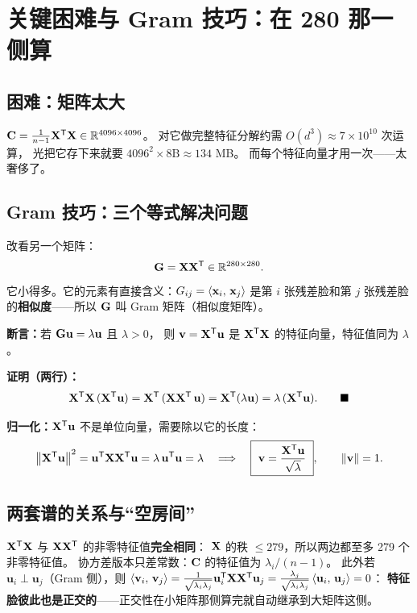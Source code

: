 \section{关键困难与 Gram 技巧：在 280 那一侧算}

\subsection{困难：矩阵太大}

$\mathbf{C}=\frac{1}{n-1}\mathbf{X}^{\mathsf{T}}\mathbf{X}\in\mathbb{R}^{4096\times4096}$。
对它做完整特征分解约需 $O(d^3)\approx 7\times10^{10}$ 次运算，
光把它存下来就要 $4096^2\times 8\text{B}\approx 134$ MB。
而每个特征向量才用一次——太奢侈了。

\subsection{Gram 技巧：三个等式解决问题}

改看另一个矩阵：
\[
\mathbf{G}=\mathbf{X}\mathbf{X}^{\mathsf{T}}\in\mathbb{R}^{280\times 280}.
\]
它小得多。它的元素有直接含义：$G_{ij}=\left\langle \mathbf{x}_i,\,\mathbf{x}_j \right\rangle$
是第 $i$ 张残差脸和第 $j$ 张残差脸的\textbf{相似度}——所以 $\mathbf{G}$ 叫 Gram 矩阵（相似度矩阵）。

\textbf{断言：}若 $\mathbf{G}\mathbf{u}=\lambda\mathbf{u}$ 且 $\lambda>0$，
则 $\mathbf{v}=\mathbf{X}^{\mathsf{T}}\mathbf{u}$ 是 $\mathbf{X}^{\mathsf{T}}\mathbf{X}$ 的特征向量，特征值同为 $\lambda$。

\textbf{证明（两行）：}
\[
\mathbf{X}^{\mathsf{T}}\mathbf{X}\,(\mathbf{X}^{\mathsf{T}}\mathbf{u})
=\mathbf{X}^{\mathsf{T}}\,(\mathbf{X}\mathbf{X}^{\mathsf{T}}\,\mathbf{u})
=\mathbf{X}^{\mathsf{T}}(\lambda\mathbf{u})
=\lambda\,(\mathbf{X}^{\mathsf{T}}\mathbf{u}).\qquad\blacksquare
\]

\textbf{归一化：}$\mathbf{X}^{\mathsf{T}}\mathbf{u}$ 不是单位向量，需要除以它的长度：
\[
\norm{\mat{X}\mT\mathbf{u}}^2
=\mathbf{u}\mT\mat{X}\mat{X}\mT\mathbf{u}
=\lambda\,\mathbf{u}\mT\mathbf{u}=\lambda
\quad\Longrightarrow\quad
\boxed{\ \mathbf{v}=\frac{\mat{X}\mT\mathbf{u}}{\sqrt{\lambda}}\ },\qquad \norm{\mathbf{v}}=1 .
\]

\subsection{两套谱的关系与“空房间”}

$\mathbf{X}^{\mathsf{T}}\mathbf{X}$ 与 $\mathbf{X}\mathbf{X}^{\mathsf{T}}$ 的非零特征值\textbf{完全相同}：
$\mathbf{X}$ 的秩 $\le 279$，所以两边都至多 279 个非零特征值。
协方差版本只差常数：$\mathbf{C}$ 的特征值为 $\lambda_i/(n-1)$。
此外若 $\mathbf{u}_i\perp\mathbf{u}_j$（Gram 侧），则
$\left\langle \mathbf{v}_i,\,\mathbf{v}_j \right\rangle=\tfrac{1}{\sqrt{\lambda_i\lambda_j}}\mathbf{u}_i^{\mathsf{T}}\mathbf{X}\mathbf{X}^{\mathsf{T}}\mathbf{u}_j
=\tfrac{\lambda_j}{\sqrt{\lambda_i\lambda_j}}\left\langle \mathbf{u}_i,\,\mathbf{u}_j \right\rangle=0$：
\textbf{特征脸彼此也是正交的}——正交性在小矩阵那侧算完就自动继承到大矩阵这侧。

